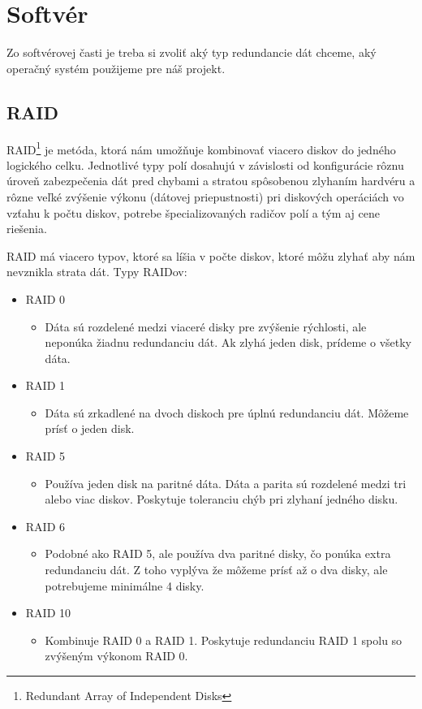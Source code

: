 \documentclass[12pt,oneside,slovak,a4paper]{article}
\begin{document}
\section{Softvér}
Zo softvérovej časti je treba si zvoliť aký typ redundancie dát chceme, aký operačný systém použijeme pre náš projekt.

\subsection{RAID}
RAID\footnote{Redundant Array of Independent Disks} je metóda, ktorá nám umožňuje kombinovať viacero diskov do jedného logického celku. Jednotlivé typy polí dosahujú v závislosti od konfigurácie rôznu úroveň zabezpečenia dát pred chybami a stratou spôsobenou zlyhaním hardvéru a rôzne veľké zvýšenie výkonu (dátovej priepustnosti) pri diskových operáciách vo vzťahu k počtu diskov, potrebe špecializovaných radičov polí a tým aj cene riešenia.

RAID má viacero typov, ktoré sa líšia v počte diskov, ktoré môžu zlyhať aby nám nevznikla strata dát. Typy RAIDov:
\begin{spacing}{1.0}
    \begin{itemize}
        \item RAID 0
            \begin{itemize}
                \item Dáta sú rozdelené medzi viaceré disky pre zvýšenie rýchlosti, ale neponúka žiadnu redundanciu dát. Ak zlyhá jeden disk, prídeme o všetky dáta.
            \end{itemize}
        \item RAID 1
            \begin{itemize}
                \item Dáta sú zrkadlené na dvoch diskoch pre úplnú redundanciu dát. Môžeme prísť o jeden disk.
            \end{itemize}
        \item RAID 5
            \begin{itemize}
                \item Používa jeden disk na paritné dáta. Dáta a parita sú rozdelené medzi tri alebo viac diskov. Poskytuje toleranciu chýb pri zlyhaní jedného disku.
            \end{itemize}
        \item RAID 6
            \begin{itemize}
                \item Podobné ako RAID 5, ale používa dva paritné disky, čo ponúka extra redundanciu dát. Z toho vyplýva že môžeme prísť až o dva disky, ale potrebujeme minimálne 4 disky.
            \end{itemize}
        \item RAID 10
            \begin{itemize}
                \item Kombinuje RAID 0 a RAID 1. Poskytuje redundanciu RAID 1 spolu so zvýšeným výkonom RAID 0.
            \end{itemize}
    \end{itemize}
\end{spacing}
\end{document}
